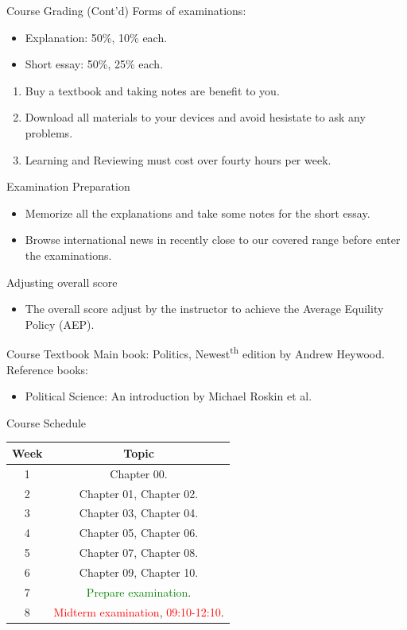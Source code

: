 \documentclass{beamer}
\begin{document}
\begin{frame}{Course Grading (Cont'd)}
Forms of examinations:
\begin{itemize}
\item Explanation: 50\%, 10\% each.
\item Short essay: 50\%, 25\% each.
\end{itemize}
\begin{enumerate}
\item Buy a textbook and taking notes are benefit to you.
\item Download all materials to your devices and avoid hesistate to ask any problems.
\item Learning and Reviewing must cost over fourty hours per week.
\end{enumerate}
\end{frame}
\begin{frame}{Examination Preparation}
\begin{itemize}
\item Memorize all the explanations and take some notes for the short essay.
\item Browse international news in recently close to our covered range before enter the examinations.
\end{itemize}
\begin{block}{Adjusting overall score}
\begin{itemize}
\item The overall score adjust by the instructor to achieve the Average Equility Policy (AEP).
\end{itemize}
\end{block}
\end{frame}
\begin{frame}{Course Textbook}
Main book: Politics, Newest\textsuperscript{th} edition by Andrew Heywood. \\
Reference books:
\begin{itemize}
\item Political Science: An introduction by Michael Roskin et al.
\end{itemize}
\end{frame}
\begin{frame}{Course Schedule}
\begin{center}
\begin{tabular}{|c|c|}
\hline
Week & Topic \\
\hline
1 & Chapter 00.\\
\hline
2 & Chapter 01, Chapter 02.\\
\hline
3 & Chapter 03, Chapter 04.\\
\hline
4 & Chapter 05, Chapter 06.\\
\hline
5 & Chapter 07, Chapter 08.\\
\hline
6 & Chapter 09, Chapter 10.\\
\hline
7 & \textcolor{Green}{Prepare examination}.\\
\hline
8 & \textcolor{red}{Midterm examination}, \textcolor{red}{09:10-12:10}.\\
\hline
\end{tabular}
\end{center}
\end{frame}
\end{document}
